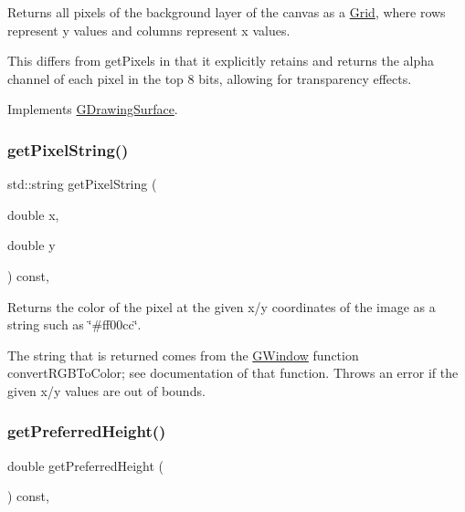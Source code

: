 Returns all pixels of the background layer of the canvas as a \mbox{\hyperlink{classGrid}{Grid}}, where rows represent y values and columns represent x values. 

This differs from get\+Pixels in that it explicitly retains and returns the alpha channel of each pixel in the top 8 bits, allowing for transparency effects. 

Implements \mbox{\hyperlink{classGDrawingSurface_a5712954f3edce2e1e4dd3109ffe16e05}{G\+Drawing\+Surface}}.

\mbox{\label{classGDrawingSurface_a8da04ef488ec5fa498fbbffaf50928fd}} 
\subsubsection{\texorpdfstring{get\+Pixel\+String()}{getPixelString()}}
{\footnotesize\ttfamily std\+::string get\+Pixel\+String (\begin{DoxyParamCaption}\item[{double}]{x,  }\item[{double}]{y }\end{DoxyParamCaption}) const\hspace{0.3cm}{\ttfamily [virtual]}, {\ttfamily [inherited]}}



Returns the color of the pixel at the given x/y coordinates of the image as a string such as \char`\"{}\#ff00cc\char`\"{}. 

The string that is returned comes from the {\ttfamily \mbox{\hyperlink{classGWindow}{G\+Window}}} function {\ttfamily convert\+R\+G\+B\+To\+Color}; see documentation of that function. Throws an error if the given x/y values are out of bounds. \mbox{\label{classGInteractor_a747de0961653847bdc6615dbf756d715}} 
\subsubsection{\texorpdfstring{get\+Preferred\+Height()}{getPreferredHeight()}}
{\footnotesize\ttfamily double get\+Preferred\+Height (\begin{DoxyParamCaption}{ }\end{DoxyParamCaption}) const\hspace{0.3cm}{\ttfamily [virtual]}, {\ttfamily [inherited]}}



